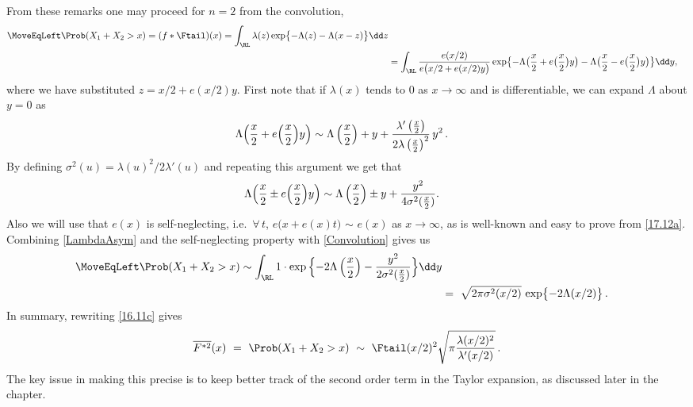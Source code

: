 From these remarks one may proceed for $n=2$
from the convolution,
\begin{align} \label{Convolution}
	\nonumber \MoveEqLeft \Prob(X_1 + X_2 >x) = (f \ast \Ftail)(x)
	= \int_{\RL} \lambda(z) \exp\bigl\{-\Lambda(z)-\Lambda(x-z)\bigr\}\dd z \\
	&= \int_{\RL}
	\frac{ e(x/2) }{ e\bigl(x/2 + e(x/2)y \bigr)  } \exp \bigl\{ {-} \Lambda \bigl(\frac{x}{2} + e\bigl(\frac{x}{2}\bigr) y \bigr)-\Lambda \bigl(\frac{x}{2}- e\bigl(\frac{x}{2}\bigr) y \bigr) \bigr\} \dd y,
\end{align} %
where we have substituted $z=x/2+e(x/2) y$. First note that if $\lambda(x)$ tends to 0 as $x\to \infty$ and is differentiable, we can expand $\Lambda$ about $y=0$ as
\begin{align*}
	\Lambda \Bigl(\frac{x}{2} + e\Bigl(\frac{x}{2}\Bigr) y \Bigr) &\sim \Lambda \left(\frac{x}{2}\right) + y +\frac{\lambda '\left(\frac{x}{2}\right)}{2 \lambda \left(\frac{x}{2}\right)^2} \,y^2 \,.
\end{align*}
By defining $\sigma^2(u)=\lambda(u)^2/2\lambda'(u)$ and repeating this argument we get that
\begin{align} \label{LambdaAsym}
	\Lambda \Bigl(\frac{x}{2} \pm e\Bigl(\frac{x}{2}\Bigr) y \Bigr) &\sim \Lambda \left(\frac{x}{2}\right) \pm y +\frac{y^2}{4 \sigma^2(\frac{x}{2})}.
\end{align}
Also we will use that $e(x)$ is self-neglecting, i.e.\ $\forall\, t$, $e\bigl(x+e(x)t\bigr)$ $\sim$ $e(x)$ as $x\to\infty$, as is well-known and easy to prove from \eqref{17.12a}.
Combining \eqref{LambdaAsym} and the self-neglecting property with \eqref{Convolution} gives us
\begin{align}\nonumber \MoveEqLeft
\Prob(X_1+X_2>x) \sim \int_{\RL}  1 \cdot \exp \Big\{ {-}2 \Lambda \left(\frac{x}{2}\right) - \frac{y^2}{2 \sigma^2(\frac{x}{2})} \Big\} \dd y \\
\label{16.11c}&=\ \sqrt{2\pi\sigma^2(x/2)} \, \exp\bigl\{-2\Lambda(x/2)\bigr\} \,.
\end{align}
In summary, rewriting \eqref{16.11c} gives
\begin{equation}\label{17.12b}
\overline{F^{*2}}(x)\ =\ \Prob(X_1+X_2>x)\ \sim\ \Ftail(x/2)^2\sqrt{\pi \frac{\lambda(x/2)^2}{\lambda'(x/2)}}\,.
\end{equation}
The key issue in making this precise is to keep better track of the second order term in the Taylor
expansion, as discussed later in the chapter.

